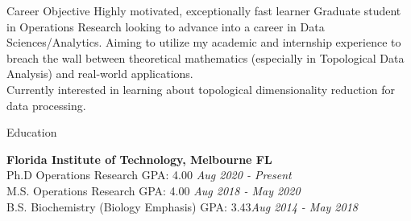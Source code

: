 \documentclass{resume} %
\begin{document}

\begin{rSection}{Career Objective}
    Highly motivated, exceptionally fast learner Graduate student in Operations Research looking to advance into a career in Data Sciences/Analytics.
    Aiming to utilize my academic and internship experience to breach the wall between theoretical mathematics (especially in Topological Data Analysis) and real-world applications.\\
    Currently interested in learning about topological dimensionality reduction for data processing.
\end{rSection}




\begin{rSection}{Education}

    {\bf Florida Institute of Technology, Melbourne FL}
    \\ Ph.D Operations Research  GPA: 4.00 \hfill {\em Aug 2020 - Present}
    \\ M.S. Operations Research  GPA: 4.00 \hfill {\em Aug 2018 - May 2020}
    \\ B.S. Biochemistry (Biology Emphasis)    GPA: 3.43\hfill {\em Aug 2014 - May 2018}
\end{rSection}

\end{document}
